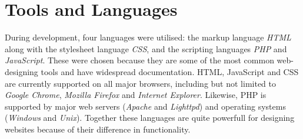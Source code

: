\chapter{Tools and Languages}

During development, four languages were utilised: the markup language \emph{HTML} along with the stylesheet language \emph{CSS}, and the scripting languages \emph{PHP} and \emph{JavaScript}. These were chosen because they are some of the most common web-designing tools and have widespread documentation. HTML, JavaScript and CSS are currently supported on all major browsers, including but not limited to \emph{Google Chrome}, \emph{Mozilla Firefox} and \emph{Internet Explorer}. Likewise, PHP is supported by major web servers (\emph{Apache} and \emph{Lighttpd}) and operating systems (\emph{Windows} and \emph{Unix}).
Together these languages are quite powerfull for designing websites because of their difference in functionality.
\label{implementation_tools_languages}
